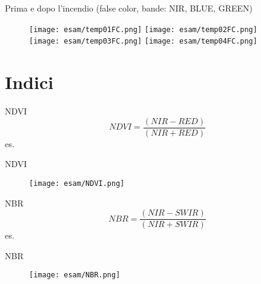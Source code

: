 \documentclass{beamer} %
\begin{document}
        \begin{frame}{Prima e dopo l'incendio (false color, bande: NIR, BLUE, GREEN)}
            \begin{figure}
                \centering
                \texttt{[image: esam/temp01FC.png]}
                \texttt{[image: esam/temp02FC.png]} \\
                \texttt{[image: esam/temp03FC.png]}
                \texttt{[image: esam/temp04FC.png]} \\
            \end{figure}
        \end{frame}
        
\section{Indici}

        \begin{frame}{NDVI}
            \begin{equation}
                NDVI = \frac{(NIR - RED)}{(NIR + RED)}
            \end{equation}
            es.
            
        \end{frame}

        \begin{frame}{NDVI}
            \begin{figure}
                \centering
                \texttt{[image: esam/NDVI.png]}
            \end{figure}
        \end{frame}
           
        \begin{frame}{NBR}
            \begin{equation}
                NBR = \frac{(NIR - SWIR)}{(NIR + SWIR)}
            \end{equation}
            es.
            
        \end{frame}

        \begin{frame}{NBR}
            \begin{figure}
                \centering
                \texttt{[image: esam/NBR.png]}
            \end{figure} 
        \end{frame}
\end{document}
